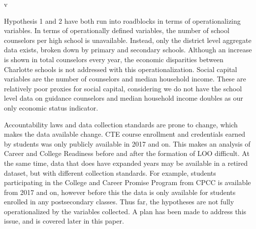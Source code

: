 \vspace{2cm}v


Hypothesis 1 and 2 have both run into roadblocks in terms of operationalizing variables. In terms of operationally defined variables, the number of school counselors per high school is unavailable. 
Instead, only the district level aggregate data exists, broken down by primary and secondary schools. 
Although an increase is shown in total counselors every year, the economic disparities between Charlotte schools is not addressed with this operationalization. 
Social capital variables are the number of counselors and median household income. 
These are relatively poor proxies for social capital, considering we do not have the school level data on guidance counselors and median household income doubles as our only economic status indicator. 

Accountability laws and data collection standards are prone to change, which makes the data available change. 
CTE course enrollment and credentials earned by students was only publicly available in 2017 and on. 
This makes an analysis of Career and College Readiness before and after the formation of LOO difficult. At the same time, data that does have expanded years may be available in a retired dataset, but with different collection standards. 
For example, students participating in the College and Career Promise Program from CPCC is available from 2017 and on, however before this the data is only available for students enrolled in any postsecondary classes. 
Thus far, the hypotheses are not fully operationalized by the variables collected. 
A plan has been made to address this issue, and is covered later in this paper. 
